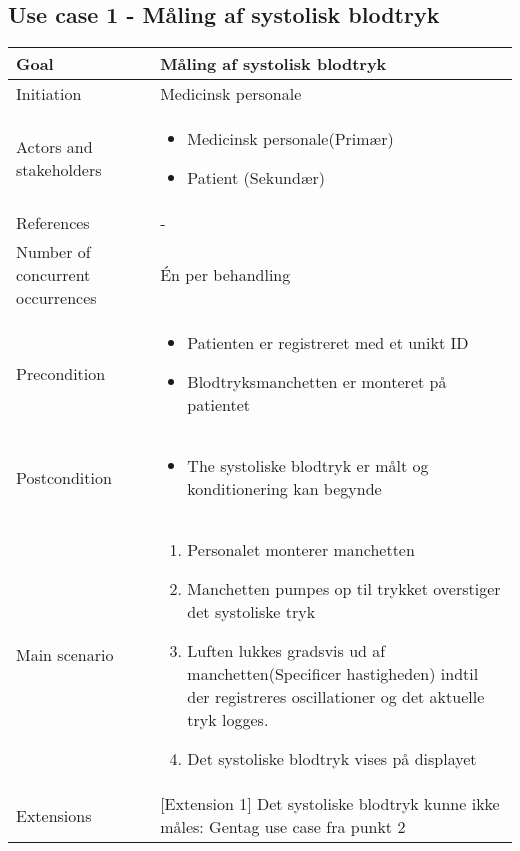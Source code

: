 \subsection{Use case 1 - Måling af systolisk blodtryk}
\begin{center}
		\begin{tabular}{ | m{4cm} | m{8cm}| } 
			\hline
			Goal& Måling af systolisk blodtryk \\ 
			\hline
			Initiation &  Medicinsk personale\\
			\hline
			Actors and stakeholders & 
			\begin{itemize}
				\item Medicinsk personale(Primær)
				\item Patient (Sekundær)
			\end{itemize} \\ 
			\hline
			References & - \\ 
			\hline
			Number of concurrent occurrences & Én per behandling\\ 
			\hline	
			Precondition & 
			\begin{itemize}
				\item Patienten er registreret med et unikt ID
				\item Blodtryksmanchetten er monteret på patientet
			\end{itemize} \\ 
			\hline
			Postcondition & 
			\begin{itemize}
				\item The systoliske blodtryk er målt og konditionering kan begynde
			\end{itemize} \\ 
			\hline
			Main scenario & \begin{enumerate}
				\item Personalet monterer manchetten
				\item Manchetten pumpes op til trykket overstiger det systoliske tryk
				\item Luften lukkes gradsvis ud af manchetten(Specificer hastigheden) indtil der registreres oscillationer og det aktuelle tryk logges. 
				\item Det systoliske blodtryk vises på displayet
			\end{enumerate} \\ 
			\hline
			Extensions & [Extension 1] Det systoliske blodtryk kunne ikke måles: Gentag use case fra punkt 2 \\ 
			\hline
		\end{tabular}
		
	\end{center}